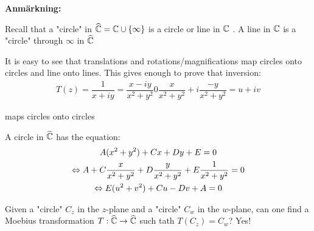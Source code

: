 \par\bigskip
\noindent\textbf{Anmärkning:}\par
\noindent Recall that a "circle" in $\widehat{\mathbb{C}} = \mathbb{C}\cup\left\{\infty\right\}$ is a circle or line in $\mathbb{C}$ . A line in $\mathbb{C}$ is a "circle" through $\infty$ in $\widehat{\mathbb{C}}$
\par\bigskip
\begin{prf}[]{}
  It is easy to see that translations and rotations/magnifications map circles onto circles and line onto lines. This gives enough to prove that inversion:
  \begin{equation*}
    \begin{gathered}
      T(z) = \dfrac{1}{x+iy} = \dfrac{x-iy}{x^2+y^2} 0 \dfrac{x}{x^2+y^2}+i\dfrac{-y}{x^2+y^2} = u+iv
    \end{gathered}
  \end{equation*}\par
  \noindent maps circles onto circles
  \par\bigskip
  A circle in $\widehat{\mathbb{C}}$ has the equation:
  \begin{equation*}
    \begin{gathered}
      A(x^2+y^2)+Cx+Dy+E = 0\\
      \Leftrightarrow A+C\dfrac{x}{x^2+y^2} + D\dfrac{y}{x^2+y^2}+E\dfrac{1}{x^2+y^2} = 0\\
      \Leftrightarrow E(u^2+v^2) +Cu-Dv+A = 0
    \end{gathered}
  \end{equation*}
\end{prf}
\par\bigskip
\noindent Given a "circle" $C_z$ in the $z$-plane and a "circle" $C_w$ in the $w$-plane, can one find a Moebius transformation $T:\widehat{\mathbb{C}}\to\widehat{\mathbb{C}}$  such tath $T(C_z) = C_w$? Yes!
\newpage
